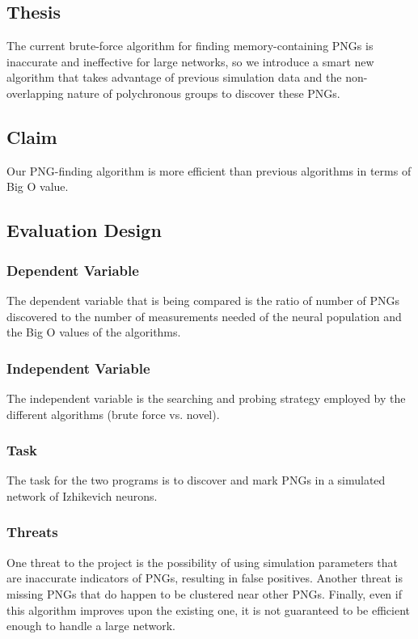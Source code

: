 \documentclass{sigchi}
\begin{document}
\subsection{Thesis}
The current brute-force algorithm for finding memory-containing PNGs is inaccurate and ineffective for large networks, so we introduce a smart new algorithm that takes advantage of previous simulation data and the non-overlapping nature of polychronous groups to discover these PNGs.

\subsection{Claim}
Our PNG-finding algorithm is more efficient than previous algorithms in terms of Big O value.

\subsection{Evaluation Design}
\subsubsection{Dependent Variable}
The dependent variable that is being compared is the ratio of number of PNGs discovered to the number of measurements needed of the neural population and the Big O values of the algorithms. 

\subsubsection{Independent Variable}
The independent variable is the searching and probing strategy employed by the different algorithms (brute force vs. novel).

\subsubsection{Task}
The task for the two programs is to discover and mark PNGs in a simulated network of Izhikevich neurons.

\subsubsection{Threats}
One threat to the project is the possibility of using simulation parameters that are inaccurate indicators of PNGs, resulting in false positives. Another threat is missing PNGs that do happen to be clustered near other PNGs. Finally, even if this algorithm improves upon the existing one, it is not guaranteed to be efficient enough to handle a large network.
\end{document}
